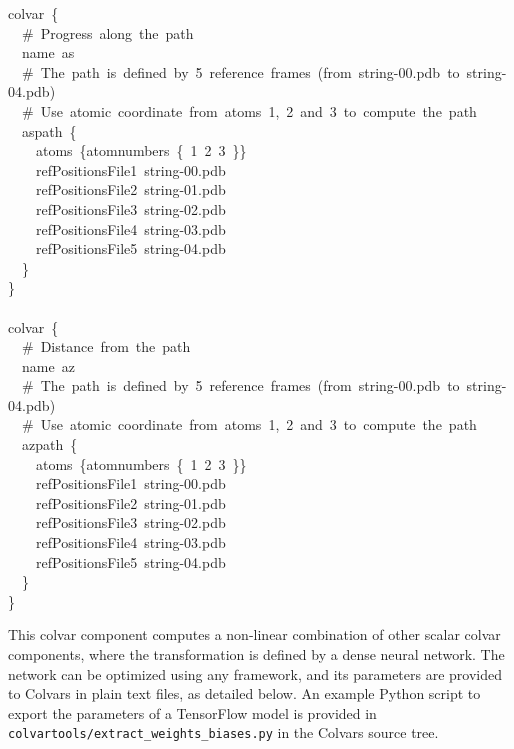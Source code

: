 \begin{cvexampleinput}
\-colvar~\{\\
\-~~\#~Progress~along~the~path\\
\-~~name~as\\
\-~~\#~The~path~is~defined~by~5~reference~frames~(from~string-00.pdb~to~string-04.pdb)\\
\-~~\#~Use~atomic~coordinate~from~atoms~1,~2~and~3~to~compute~the~path\\
\-~~aspath~\{\\
\-~~~~atoms~\{atomnumbers~\{~1~2~3~\}\}\\
\-~~~~refPositionsFile1~string-00.pdb\\
\-~~~~refPositionsFile2~string-01.pdb\\
\-~~~~refPositionsFile3~string-02.pdb\\
\-~~~~refPositionsFile4~string-03.pdb\\
\-~~~~refPositionsFile5~string-04.pdb\\
\-~~\}\\
\-\}\\
\-\\
\-colvar~\{\\
\-~~\#~Distance~from~the~path\\
\-~~name~az\\
\-~~\#~The~path~is~defined~by~5~reference~frames~(from~string-00.pdb~to~string-04.pdb)\\
\-~~\#~Use~atomic~coordinate~from~atoms~1,~2~and~3~to~compute~the~path\\
\-~~azpath~\{\\
\-~~~~atoms~\{atomnumbers~\{~1~2~3~\}\}\\
\-~~~~refPositionsFile1~string-00.pdb\\
\-~~~~refPositionsFile2~string-01.pdb\\
\-~~~~refPositionsFile3~string-02.pdb\\
\-~~~~refPositionsFile4~string-03.pdb\\
\-~~~~refPositionsFile5~string-04.pdb\\
\-~~\}\\
\}
\end{cvexampleinput}


This colvar component computes a non-linear combination of other scalar colvar components, where the transformation is defined by a dense neural network.\cite{Chen2022}
The network can be optimized using any framework, and its parameters are provided to Colvars in plain text files, as detailed below.
An example Python script to export the parameters of a TensorFlow model is provided in \texttt{colvartools/extract\_weights\_biases.py} in the Colvars source tree.

